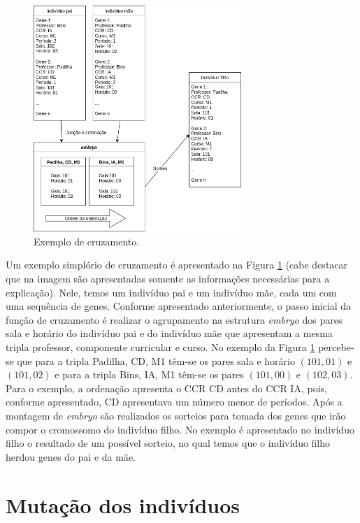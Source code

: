 \documentclass[12pt]{article}
\begin{document}
\begin{figure}[!ht]
\caption{Exemplo de cruzamento.}
\label{fig:cross}
\centering
\includegraphics[width=0.7\textwidth]{cross.png}
\end{figure}

Um exemplo simplório de cruzamento é apresentado na Figura \ref{fig:cross} (cabe destacar que na imagem são apresentadas somente as informações necessárias para a explicação). Nele, temos um indivíduo pai e um indivíduo mãe, cada um com uma sequência de genes. Conforme apresentado anteriormente, o passo inicial da função de cruzamento é realizar o agrupamento na estrutura \emph{embryo} dos pares sala e horário do indivíduo pai e do indivíduo mãe que apresentam a mesma tripla professor, componente curricular e curso. No exemplo da Figura \ref{fig:cross} percebe-se que para a tripla Padilha, CD, M1 têm-se os pares sala e horário $(101, 01)$ e $(101, 02)$ e para a tripla Bins, IA, M1 têm-se os pares $(101, 00)$ e $(102, 03)$. Para o exemplo, a ordenação apresenta o CCR CD antes do CCR IA, pois, conforme apresentado, CD apresentava um número menor de períodos. Após a montagem de \emph{embryo} são realizados os sorteios para tomada dos genes que irão compor o cromossomo do indivíduo filho. No exemplo é apresentado no indivíduo filho o resultado de um possível sorteio, no qual temos que o indivíduo filho herdou genes do pai e da mãe.

\section{Mutação dos indivíduos}
\end{document}
